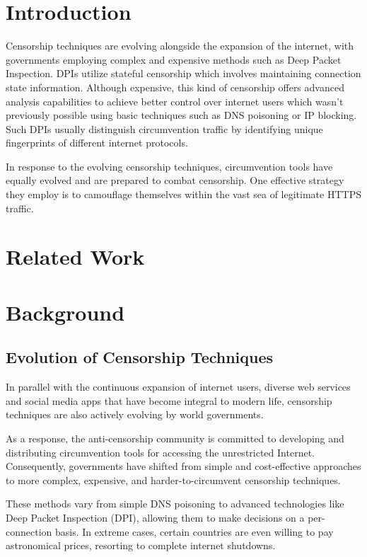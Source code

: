 \section{Introduction}
Censorship techniques are evolving alongside the expansion of the internet, with governments employing complex and expensive methods such as Deep Packet Inspection. DPIs utilize stateful censorship which involves maintaining connection state information. Although expensive, this kind of censorship offers advanced analysis capabilities to achieve better control over internet users which wasn't previously possible using basic techniques such as DNS poisoning or IP blocking. Such DPIs usually distinguish circumvention traffic by identifying unique fingerprints of different internet protocols.

In response to the evolving censorship techniques, circumvention tools have equally evolved and are prepared to combat censorship. One effective strategy they employ is to camouflage themselves within the vast sea of legitimate HTTPS traffic.

\section{Related Work}

\section{Background}
\subsection{Evolution of Censorship Techniques}
In parallel with the continuous expansion of internet users, diverse web services and social media apps that have become integral to modern life, censorship techniques are also actively evolving by world governments. 

As a response, the anti-censorship community is committed to developing and distributing circumvention tools for accessing the unrestricted Internet. Consequently, governments have shifted from simple and cost-effective approaches to more complex, expensive, and harder-to-circumvent censorship techniques.

These methods vary from simple DNS poisoning to advanced technologies like Deep Packet Inspection (DPI), allowing them to make decisions on a per-connection basis. In extreme cases, certain countries are even willing to pay astronomical prices, resorting to complete internet shutdowns.

